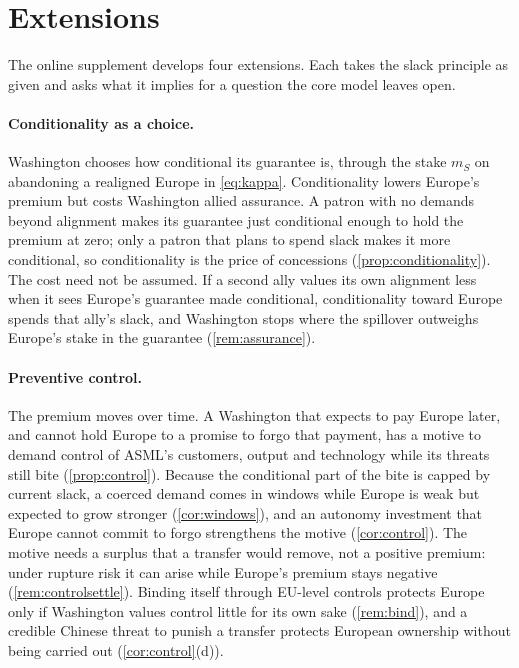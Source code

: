 \section{Extensions}\label{sec:extensions}

The online supplement develops four extensions. Each takes the slack principle as given and asks what it implies for a question the core model leaves open.

\paragraph{Conditionality as a choice.} Washington chooses how conditional its guarantee is, through the stake $m_S$ on abandoning a realigned Europe in \cref{eq:kappa}. Conditionality lowers Europe's premium but costs Washington allied assurance. A patron with no demands beyond alignment makes its guarantee just conditional enough to hold the premium at zero; only a patron that plans to spend slack makes it more conditional, so conditionality is the price of concessions (\cref{prop:conditionality}). The cost need not be assumed. If a second ally values its own alignment less when it sees Europe's guarantee made conditional, conditionality toward Europe spends that ally's slack, and Washington stops where the spillover outweighs Europe's stake in the guarantee (\cref{rem:assurance}).

\paragraph{Preventive control.} The premium moves over time. A Washington that expects to pay Europe later, and cannot hold Europe to a promise to forgo that payment, has a motive to demand control of ASML's customers, output and technology while its threats still bite (\cref{prop:control}). Because the conditional part of the bite is capped by current slack, a coerced demand comes in windows while Europe is weak but expected to grow stronger (\cref{cor:windows}), and an autonomy investment that Europe cannot commit to forgo strengthens the motive (\cref{cor:control}). The motive needs a surplus that a transfer would remove, not a positive premium: under rupture risk it can arise while Europe's premium stays negative (\cref{rem:controlsettle}). Binding itself through EU-level controls protects Europe only if Washington values control little for its own sake (\cref{rem:bind}), and a credible Chinese threat to punish a transfer protects European ownership without being carried out (\cref{cor:control}(d)).

